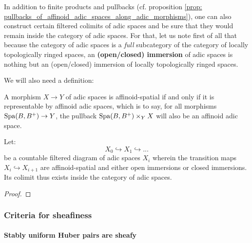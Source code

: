                     In addition to finite products and pullbacks (cf. proposition \ref{prop: pullbacks_of_affinoid_adic_spaces_along_adic_morphisms}), one can also construct certain filtered colimits of adic spaces and be sure that they would remain inside the category of adic spaces. For that, let us note first of all that because the category of adic spaces is a \textit{full} subcategory of the category of locally topologically ringed spaces, an \textbf{(open/closed) immersion} of adic spaces is nothing but an (open/closed) immersion of locally topologically ringed spaces. 
                    
                    We will also need a definition:
                    \begin{definition} \label{def: affinoid_spatial_morphisms}
                        A morphism $X \to Y$ of adic spaces is affinoid-spatial if and only if it is representable by affinoid adic spaces, which is to say, for all morphisms $\mathrm{Spa}(B, B^+) \to Y$, the pullback $\Spa(B, B^+) \x_Y X$ will also be an affinoid adic space. 
                    \end{definition}
                    
                    \begin{proposition} \label{prop: increasing_unions_of_adic_spaces}
                        Let:
                            $$X_0 \hookrightarrow X_1 \hookrightarrow ...$$
                        be a countable filtered diagram of adic spaces $X_i$ wherein the transition maps $X_i \hookrightarrow X_{i + 1}$ are affinoid-spatial and either open immersions or closed immersions. Its colimit thus exists inside the category of adic spaces.
                    \end{proposition}
                        \begin{proof}
                            
                        \end{proof}
                
            \subsubsection{Criteria for sheafiness}
                \paragraph{Stably uniform Huber pairs are sheafy}
                
